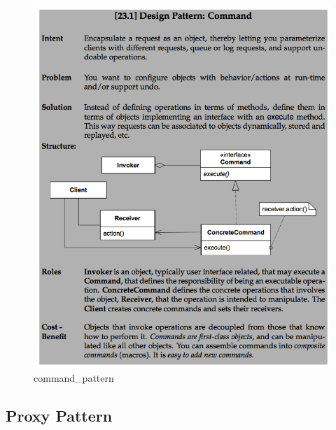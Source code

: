 \documentclass[11pt]{article}
\makeatletter
\def\maxwidth{\ifdim\Gin@nat@width>\linewidth\linewidth
    \else\Gin@nat@width\fi}
\let\Oldincludegraphics\includegraphics
\renewcommand{\includegraphics}[1]{\Oldincludegraphics[width=.8\maxwidth]{#1}}
\makeatother
\begin{document}
\begin{figure}
\centering
\includegraphics{img/command_pattern.png}
\caption{command\_pattern}
\end{figure}

\hypertarget{proxy-pattern}{%
\subsection{Proxy Pattern}\label{proxy-pattern}}
\end{document}
